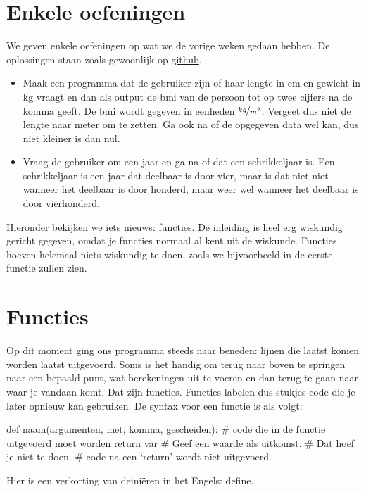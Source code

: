 \section*{Enkele oefeningen}
  We geven enkele oefeningen op wat we de vorige weken gedaan hebben. De
  oplossingen staan zoals gewoonlijk op
  \href{https://github.com/TGThorax/python-ka2ring/tree/master/src}{github}.
  \begin{itemize}
  \item Maak een programma dat de gebruiker zijn of haar lengte in cm en gewicht
    in kg vraagt en dan als output de bmi van de persoon tot op twee cijfers na
    de komma geeft. De bmi wordt gegeven in eenheden $\nicefrac{kg}{m^2}$.
    Vergeet dus niet de lengte naar meter om te zetten. Ga ook na of de
    opgegeven data wel kan, dus niet kleiner is dan nul.
  \item Vraag de gebruiker om een jaar en ga na of dat een schrikkeljaar is.
    Een schrikkeljaar is een jaar dat deelbaar is door vier, maar is dat niet
    niet wanneer het deelbaar is door honderd, maar weer wel wanneer het
    deelbaar is door vierhonderd.
  \end{itemize}
  Hieronder bekijken we iets nieuws: functies. De inleiding is heel erg
  wiskundig gericht gegeven, omdat je functies normaal al kent uit de wiskunde.
  Functies hoeven helemaal niets wiskundig te doen, zoals we bijvoorbeeld in de
  eerste functie zullen zien.
\section{Functies}
  Op dit moment ging ons programma steeds naar beneden: lijnen die laatst
  komen worden laatst uitgevoerd. Soms is het handig om terug naar boven te
  springen naar een bepaald punt, wat berekeningen uit te voeren en dan terug
  te gaan naar waar je vandaan komt. Dat zijn functies. Functies labelen dus
  stukjes code die je later opnieuw kan gebruiken. De syntax voor een functie
  is als volgt:
  \begin{python}
    def naam(argumenten, met, komma, gescheiden):
      # code die in de functie uitgevoerd moet worden
      return var # Geef een waarde als uitkomst.
                 # Dat hoef je niet te doen.
      # code na een `return' wordt niet uitgevoerd.
  \end{python}
  Hier is  een verkorting van deini\"eren in het Engels: define.

